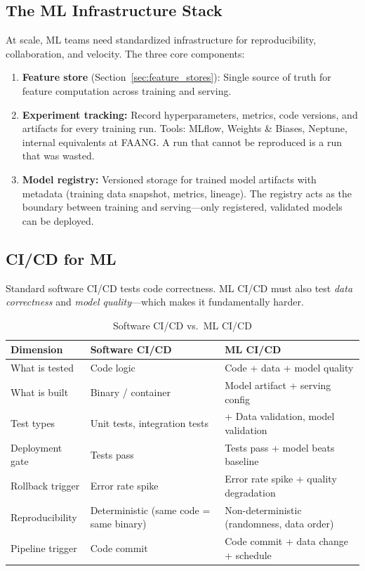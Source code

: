 \subsection{The ML Infrastructure Stack}

At scale, ML teams need standardized infrastructure for reproducibility, collaboration, and velocity. The three core components:

\begin{enumerate}
    \item \textbf{Feature store} (Section~\ref{sec:feature_stores}): Single source of truth for feature computation across training and serving.
    \item \textbf{Experiment tracking:} Record hyperparameters, metrics, code versions, and artifacts for every training run. Tools: MLflow, Weights \& Biases, Neptune, internal equivalents at FAANG. A run that cannot be reproduced is a run that was wasted.
    \item \textbf{Model registry:} Versioned storage for trained model artifacts with metadata (training data snapshot, metrics, lineage). The registry acts as the boundary between training and serving---only registered, validated models can be deployed.
\end{enumerate}

\subsection{CI/CD for ML}

Standard software CI/CD tests code correctness. ML CI/CD must also test \textit{data correctness} and \textit{model quality}---which makes it fundamentally harder.

\begin{table}[H]
\centering
\caption{Software CI/CD vs.\ ML CI/CD}
\begin{tabularx}{\textwidth}{lXX}
\toprule
\textbf{Dimension} & \textbf{Software CI/CD} & \textbf{ML CI/CD} \\
\midrule
What is tested & Code logic & Code + data + model quality \\
What is built & Binary / container & Model artifact + serving config \\
Test types & Unit tests, integration tests & + Data validation, model validation \\
Deployment gate & Tests pass & Tests pass + model beats baseline \\
Rollback trigger & Error rate spike & Error rate spike + quality degradation \\
Reproducibility & Deterministic (same code = same binary) & Non-deterministic (randomness, data order) \\
Pipeline trigger & Code commit & Code commit + data change + schedule \\
\bottomrule
\end{tabularx}
\end{table}

